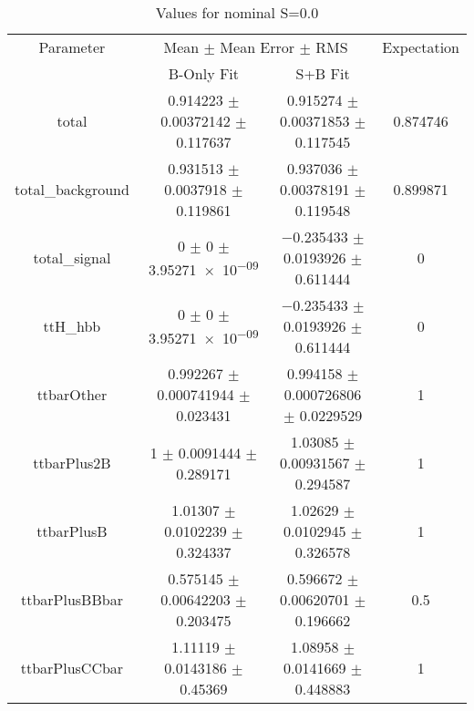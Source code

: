 \begin{table}
\centering
\caption{Values for nominal S=0.0}
\begin{tabular}{cccc}
\toprule
Parameter & \multicolumn{2}{c}{Mean $\pm$ Mean Error $\pm$ RMS} & Expectation\\
 & B-Only Fit & S+B Fit & \\
\midrule
total & \num{0.914223} $\pm$ \num{0.00372142} $\pm$ \num{0.117637} & \num{0.915274} $\pm$ \num{0.00371853} $\pm$ \num{0.117545} & \num{0.874746}\\
total\_background & \num{0.931513} $\pm$ \num{0.0037918} $\pm$ \num{0.119861} & \num{0.937036} $\pm$ \num{0.00378191} $\pm$ \num{0.119548} & \num{0.899871}\\
total\_signal & \num{0} $\pm$ \num{0} $\pm$ \num{3.95271e-09} & \num{-0.235433} $\pm$ \num{0.0193926} $\pm$ \num{0.611444} & \num{0}\\
ttH\_hbb & \num{0} $\pm$ \num{0} $\pm$ \num{3.95271e-09} & \num{-0.235433} $\pm$ \num{0.0193926} $\pm$ \num{0.611444} & \num{0}\\
ttbarOther & \num{0.992267} $\pm$ \num{0.000741944} $\pm$ \num{0.023431} & \num{0.994158} $\pm$ \num{0.000726806} $\pm$ \num{0.0229529} & \num{1}\\
ttbarPlus2B & \num{1} $\pm$ \num{0.0091444} $\pm$ \num{0.289171} & \num{1.03085} $\pm$ \num{0.00931567} $\pm$ \num{0.294587} & \num{1}\\
ttbarPlusB & \num{1.01307} $\pm$ \num{0.0102239} $\pm$ \num{0.324337} & \num{1.02629} $\pm$ \num{0.0102945} $\pm$ \num{0.326578} & \num{1}\\
ttbarPlusBBbar & \num{0.575145} $\pm$ \num{0.00642203} $\pm$ \num{0.203475} & \num{0.596672} $\pm$ \num{0.00620701} $\pm$ \num{0.196662} & \num{0.5}\\
ttbarPlusCCbar & \num{1.11119} $\pm$ \num{0.0143186} $\pm$ \num{0.45369} & \num{1.08958} $\pm$ \num{0.0141669} $\pm$ \num{0.448883} & \num{1}\\
\bottomrule
\end{tabular}
\end{table}